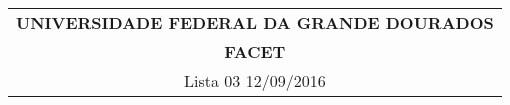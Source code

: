 \documentclass[a4paper,5pt]{amsbook}
\numberwithin{equation}{chapter}
\begin{document}
\thispagestyle{empty}
\begin{minipage}[b]{0.45\linewidth}
\begin{tabular}{c}
\hline \hline
{{\bf UNIVERSIDADE FEDERAL DA GRANDE DOURADOS}}\\

{{\bf FACET}} \\

\hline
Lista 03\hspace{12 cm}  12/09/2016  \\
\hline \hline
\end{tabular}
%
\end{minipage} 

\vspace{0.2cm}
 
\end{document}
